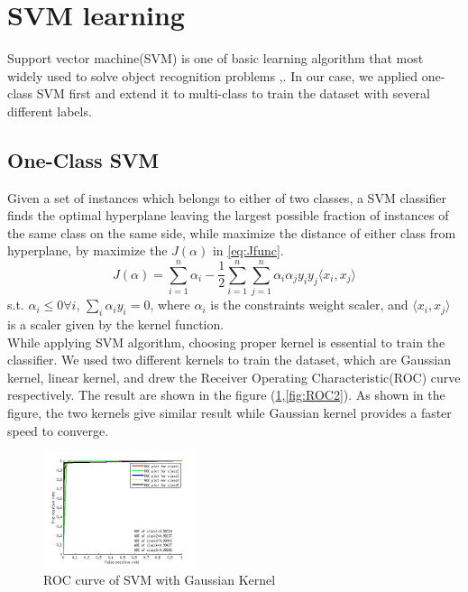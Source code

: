 \documentclass{article}
\begin{document}
\section{SVM learning}
Support vector machine(SVM) is one of basic learning algorithm that most widely used to solve object recognition problems \cite{HogDetection1},\cite{SVMforRecogintion}. In our case, we applied one-class SVM first and extend it to multi-class to train the dataset with several different labels.
\subsection{One-Class SVM}
Given a set of instances which belongs to either of two classes, a SVM classifier finds the optimal hyperplane leaving the largest possible fraction of instances of the same class on the same side, while maximize the distance of either class from hyperplane, by maximize the $J(\alpha)$ in \ref{eq:Jfunc}.
\begin{equation}
J(\alpha) = \sum_{i=1}^n \alpha_i - \frac{1}{2}\sum_{i=1}^n\sum_{j=1}^n \alpha_i \alpha_jy_iy_j\langle x_i,x_j\rangle
\label{eq:Jfunc}
\end{equation}
s.t. $\alpha_i\leq 0 \forall i$, $\sum_i \alpha_iy_i = 0$,
where $\alpha_i$ is the constraints weight scaler, and $\langle x_i,x_j \rangle$ is a scaler given by the kernel function.\\
While applying SVM algorithm, choosing proper kernel is essential to train the classifier. We used two different kernels to train the dataset, which are Gaussian kernel, linear kernel, and drew the Receiver	Operating Characteristic(ROC) curve respectively. The result are shown in the figure (\ref{fig:ROC1},\ref{fig:ROC2}). As shown in the figure, the two kernels give similar result while Gaussian kernel provides a faster speed to converge.\\
\begin{figure}[htb]
\centering
\includegraphics[width = 0.4\textwidth]{ROCgauss.jpg}
\caption{ROC curve of SVM with Gaussian Kernel}
\label{fig:ROC1}
\end{figure}
\end{document}
